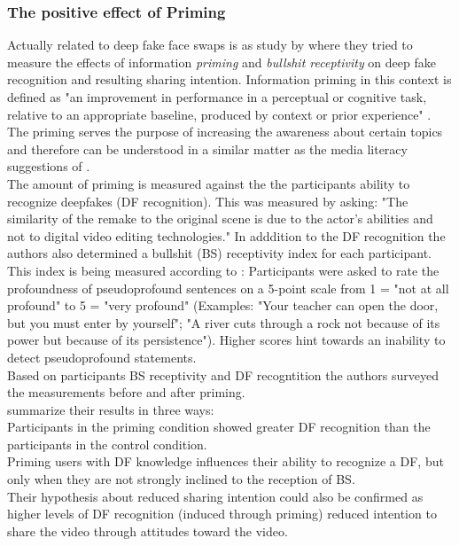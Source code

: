 \documentclass[
  a4paper,  %
  twoside,  %
  bibliography=totoc,
  headsepline,
  cleardoublepage=empty,
  parskip=half,
  draft=false
]{scrbook}
\begin{document}
\subsubsection*{The positive effect of Priming}
Actually related to deep fake face swaps is as study by \citeauthor{iacobucciDeepfakesUnmaskedEffects2021} where they tried to measure the effects of information \textit{priming} and \textit{bullshit receptivity} on deep fake recognition and resulting sharing intention. Information priming in this context is defined as "an improvement in performance in a perceptual or cognitive task, relative to an appropriate baseline, produced by context or prior experience" \cite{iacobucciDeepfakesUnmaskedEffects2021}. The priming serves the purpose of increasing the awareness about certain topics and therefore can be understood in a similar matter as the media literacy suggestions of \citeauthor{hwangEffectsDisinformationUsing2021}. \\
The amount of priming is measured against the the participants ability to recognize deepfakes (DF recognition). This was measured by asking: "The similarity of the remake to the original scene is due to the actor's abilities and not to digital video editing technologies." In adddition to the DF recognition the authors also determined a bullshit (BS) receptivity index for each participant. This index is being measured according to \cite{pennycookReceptionDetectionPseudoprofound2015}: Participants were asked to rate the profoundness of pseudoprofound sentences on a 5-point scale from 1 = "not at all profound" to 5 = "very profound" (Examples: "Your teacher can open the door, but you must enter by yourself"; "A river cuts through a rock not because of its power but because of its persistence"). Higher scores hint towards an inability to detect pseudoprofound statements. \\
Based on participants BS receptivity and DF recogntition the authors surveyed the measurements before and after priming. \\
\citeauthor{iacobucciDeepfakesUnmaskedEffects2021} summarize their results in three ways: \\
Participants in the priming condition showed greater DF recognition than the participants in the control condition. \\
Priming users with DF knowledge influences their ability to recognize a DF, but only when they are not strongly inclined to the reception of BS. \\
Their hypothesis about reduced sharing intention could also be confirmed as higher levels of DF recognition (induced through priming) reduced intention to share the video through attitudes toward the video. \\
\end{document}
